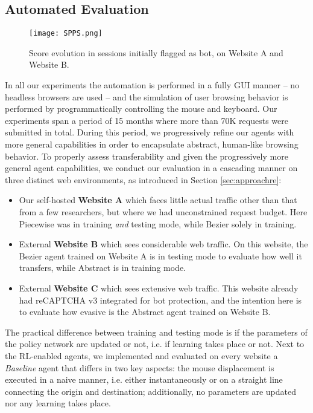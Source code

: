\subsection{Automated Evaluation}
\label{sec:auto}

\begin{figure*}[ht!]
\centerline{\texttt{[image: SPPS.png]}}
\caption{Score evolution in sessions initially flagged as bot, on Website A and Website B.}
\label{spps}
\end{figure*}

In all our experiments the automation is performed in a fully GUI manner -- no headless browsers are used -- and the simulation of user browsing behavior is performed by programmatically controlling the mouse and keyboard.
Our experiments span a period of 15 months where more than 70K requests were submitted in total.
During this period, we progressively refine our agents with more general capabilities in order to encapsulate abstract, human-like browsing behavior.
To properly assess transferability and given the progressively more general agent capabilities, we conduct our evaluation in a cascading manner on three distinct web environments, as introduced in Section \ref{sec:approachre}:

\begin{itemize}
    \item Our self-hosted \textbf{Website A} which faces little actual traffic other than that from a few researchers, but where we had unconstrained request budget.
    Here Piecewise was in training \textit{and} testing mode, while Bezier solely in training.
    \item External \textbf{Website B} which sees considerable web traffic.
    On this website, the Bezier agent trained on Website A is in testing mode to evaluate how well it transfers, while Abstract is in training mode.
    \item External \textbf{Website C} which sees extensive web traffic.
    This website already had reCAPTCHA v3 integrated for bot protection, and the intention here is to evaluate how evasive is the Abstract agent trained on Website B.
\end{itemize}

The practical difference between training and testing mode is if the parameters of the policy network are updated or not, i.e. if learning takes place or not.
Next to the RL-enabled agents, we implemented and evaluated on every website a \textit{Baseline} agent that differs in two key aspects: the mouse displacement is executed in a naive manner, i.e. either instantaneously or on a straight line connecting the origin and destination; additionally, no parameters are updated nor any learning takes place.

